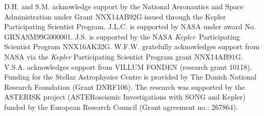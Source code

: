 \documentclass[twocolumn,tighten]{aastex61}
\renewcommand{\_}{\discretionary{\underscore}{}{\underscore}}  %
\newcommand\Kepler{\textit{Kepler}}
\begin{document}
D.H. and S.M. acknowledge support by the National Aeronautics and Space Administration under Grant NNX14AB92G issued through the Kepler Participating Scientist Program. J.L.C. is supported by NASA under award No. GRNASM99G000001. J.S. is supported by the NASA \Kepler\ Participating Scientist Program NNX16AK32G.  W.F.W. gratefully acknowledges support from NASA via the \Kepler{} Participating Scientist Program grant NNX14AB91G. V.S.A. acknowledges support from VILLUM FONDEN (research grant 10118).
Funding for the Stellar Astrophysics Centre is provided by The Danish National Research Foundation (Grant DNRF106). The research was supported by the ASTERISK project (ASTERoseismic Investigations with SONG and Kepler) funded by the European Research Council (Grant agreement no.: 267864).


%




\appendix
\twocolumngrid



\clearpage
\end{document}
